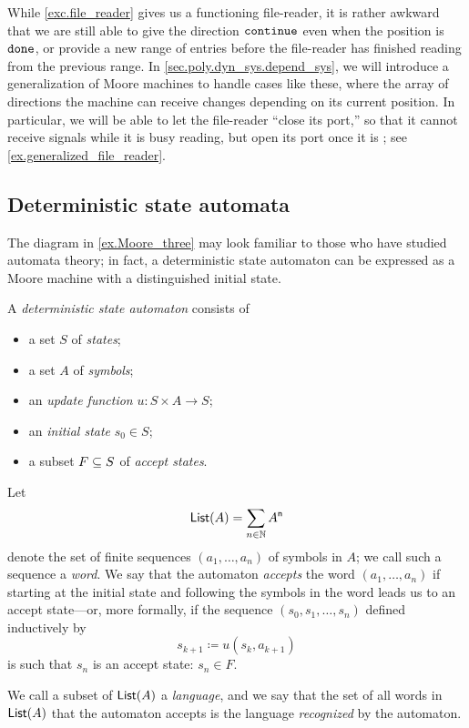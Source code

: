 \documentclass[Book-Poly]{subfiles}
\begin{document}
While \cref{exc.file_reader} gives us a functioning file-reader, it is rather awkward that we are still able to give the direction $\const{continue}$ even when the position is $\const{done}$, or provide a new range of entries before the file-reader has finished reading from the previous range.
In \cref{sec.poly.dyn_sys.depend_sys}, we will introduce a generalization of Moore machines to handle cases like these, where the array of directions the machine can receive changes depending on its current position.
In particular, we will be able to let the file-reader ``close its port,'' so that it cannot receive signals while it is busy reading, but open its port once it is ; see \cref{ex.generalized_file_reader}.

\subsection{Deterministic state automata}

The diagram in \cref{ex.Moore_three} may look familiar to those who have studied automata theory; in fact, a deterministic state automaton can be expressed as a Moore machine with a distinguished initial state.


\begin{definition}\label{def.dfa}
A \emph{deterministic state automaton} consists of
\begin{itemize}
	\item a set $S$ of \emph{states};
	\item a set $A$ of \emph{symbols};
	\item an \emph{update function} $u\colon S\times A\to S$;
	\item an \emph{initial state} $s_0\in S$;
	\item a subset $F\ss S$ of \emph{accept states}.
\end{itemize}
Let
\[
  \lst(A)=\sum_{n\in\nn}A^\ord{n}
\]
denote the set of finite sequences $(a_1,\ldots,a_n)$ of symbols in $A$; we call such a sequence a \emph{word}.
We say that the automaton \emph{accepts} the word $(a_1,\ldots,a_n)$ if starting at the initial state and following the symbols in the word leads us to an accept state---or, more formally, if the sequence $(s_0,s_1,\ldots,s_n)$ defined inductively by
\[
  s_{k+1}\coloneqq u(s_k,a_{k+1})
\]
is such that $s_n$ is an accept state: $s_n\in F$.

We call a subset of $\lst(A)$ a \emph{language}, and we say that the set of all words in $\lst(A)$ that the automaton accepts is the language \emph{recognized} by the automaton.
\end{definition}
\end{document}
